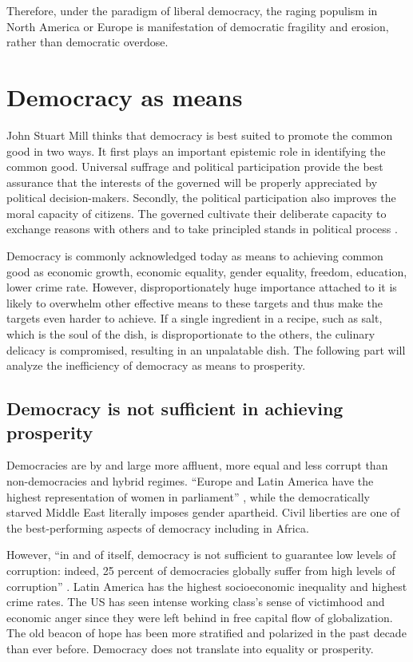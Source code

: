 \documentclass{scrartcl}
\theoremstyle{definition}
\begin{document}
Therefore, under the paradigm of liberal democracy, the raging populism in North America or Europe is manifestation of democratic fragility and erosion, rather than democratic overdose. 

\section{Democracy as means}

John Stuart Mill thinks that democracy is best suited to promote the common good in two ways. It first plays an important epistemic role in identifying the common good. Universal suffrage and political participation provide the best assurance that the interests of the governed will be properly appreciated by political decision-makers. Secondly, the political participation also improves the moral capacity of citizens. The governed cultivate their deliberate capacity to exchange reasons with others and to take principled stands in political process \autocite{Mill_2010}.

Democracy is commonly acknowledged today as means to achieving common good as economic growth, economic equality, gender equality, freedom, education, lower crime rate. However, disproportionately huge importance attached to it is likely to overwhelm other effective means to these targets and thus make the targets even harder to achieve. If a single ingredient in a recipe, such as salt, which is the soul of the dish, is disproportionate to the others, the culinary delicacy is compromised, resulting in an unpalatable dish. The following part will analyze the inefficiency of democracy as means to prosperity. 

\subsection{Democracy is not sufficient in achieving prosperity}

Democracies are by and large more affluent, more equal and less corrupt than non-democracies and hybrid regimes. ``Europe and Latin America have the highest representation of women in parliament'' \autocite[6]{IDEA}, while the democratically starved Middle East literally imposes gender apartheid. Civil liberties are one of the best-performing aspects of democracy including in Africa. 

However, ``in and of itself, democracy is not sufficient to guarantee low levels of corruption: indeed, 25 percent of democracies globally suffer from high levels of corruption'' \autocite[3]{IDEA}. Latin America has the highest socioeconomic inequality and highest crime rates. The US has seen intense working class's sense of victimhood and economic anger since they were left behind in free capital flow of globalization. The old beacon of hope has been more stratified and polarized in the past decade than ever before. Democracy does not translate into equality or prosperity. 
\end{document}
